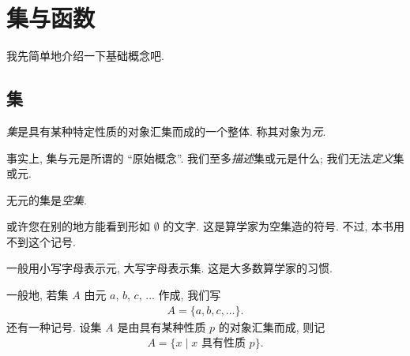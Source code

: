 \chapter{集与函数}

我先简单地介绍一下基础概念吧.

\section{集}

\begin{definition}
    \emph{集}是具有某种特定性质的对象汇集而成的一个整体. 称其对象为\emph{元}.
\end{definition}


\begin{remark}
    事实上, 集与元是所谓的 ``原始概念''. 我们至多\emph{描述}集或元是什么; 我们无法\emph{定义}集或元.
\end{remark}

\begin{definition}
    无元的集是\emph{空集}.
\end{definition}

\begin{remark}
    或许您在别的地方能看到形如 $\emptyset$ 的文字. 这是算学家为空集造的符号. 不过, 本书用不到这个记号.
\end{remark}

\begin{remark}
    一般用小写字母表示元, 大写字母表示集. 这是大多数算学家的习惯.
\end{remark}

\begin{definition}
    一般地, 若集 $A$ 由元 $a$, $b$, $c$, $\dots$ 作成, 我们写
    \begin{align*}
        A = \{ a,b,c,\dots \}.
    \end{align*}
    还有一种记号. 设集 $A$ 是由具有某种性质 $p$ 的对象汇集而成, 则记
    \begin{align*}
        A = \{ x \mid \text{$x$ 具有性质 $p$} \}.
    \end{align*}
\end{definition}

